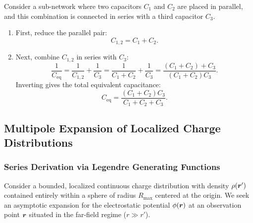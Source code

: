 \begin{example}
Consider a sub-network where two capacitors \(C_1\) and \(C_2\) are placed in parallel, and this combination is connected in series with a third capacitor \(C_3\).
\begin{enumerate}
    \item First, reduce the parallel pair:
    \begin{equation}
        C_{1,2} = C_1 + C_2.
    \end{equation}
    \item Next, combine \(C_{1,2}\) in series with \(C_3\):
    \begin{equation}
        \frac{1}{C_{\text{eq}}} = \frac{1}{C_{1,2}} + \frac{1}{C_3} = \frac{1}{C_1 + C_2} + \frac{1}{C_3} = \frac{(C_1 + C_2) + C_3}{(C_1 + C_2)C_3}.
    \end{equation}
    Inverting gives the total equivalent capacitance:
    \begin{equation}
        C_{\text{eq}} = \frac{(C_1 + C_2)C_3}{C_1 + C_2 + C_3}.
    \end{equation}
\end{enumerate}
\end{example}

\subsection{Multipole Expansion of Localized Charge Distributions}

\subsubsection{Series Derivation via Legendre Generating Functions}

Consider a bounded, localized continuous charge distribution with density \(\rho(\bm{r}')\) contained entirely within a sphere of radius \(R_{\text{max}}\) centered at the origin. We seek an asymptotic expansion for the electrostatic potential \(\phi(\bm{r})\) at an observation point \(\bm{r}\) situated in the far-field regime (\(r \gg r'\)).

